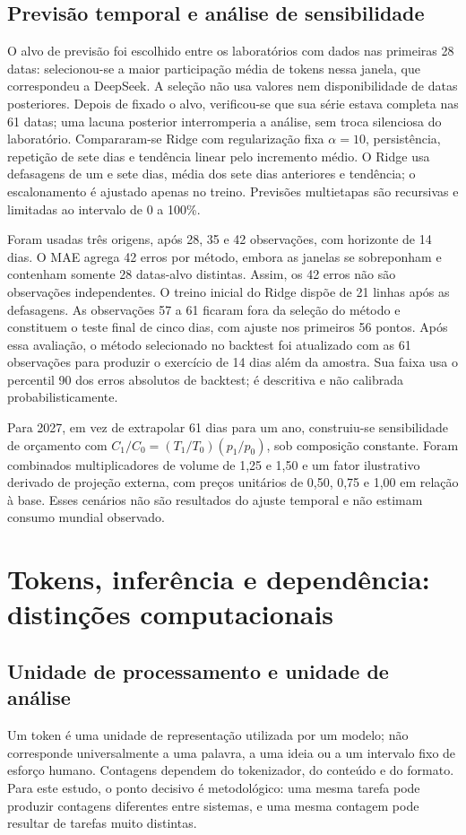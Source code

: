 \documentclass[11pt,a4paper]{article}
\begin{document}
\subsection{Previsão temporal e análise de sensibilidade}
O alvo de previsão foi escolhido entre os laboratórios com dados nas primeiras 28 datas: selecionou-se a maior participação média de tokens nessa janela, que correspondeu a DeepSeek. A seleção não usa valores nem disponibilidade de datas posteriores. Depois de fixado o alvo, verificou-se que sua série estava completa nas 61 datas; uma lacuna posterior interromperia a análise, sem troca silenciosa do laboratório. Compararam-se Ridge com regularização fixa $\alpha=10$, persistência, repetição de sete dias e tendência linear pelo incremento médio. O Ridge usa defasagens de um e sete dias, média dos sete dias anteriores e tendência; o escalonamento é ajustado apenas no treino. Previsões multietapas são recursivas e limitadas ao intervalo de 0 a 100\%.

Foram usadas três origens, após 28, 35 e 42 observações, com horizonte de 14 dias. O MAE agrega 42 erros por método, embora as janelas se sobreponham e contenham somente 28 datas-alvo distintas. Assim, os 42 erros não são observações independentes. O treino inicial do Ridge dispõe de 21 linhas após as defasagens. As observações 57 a 61 ficaram fora da seleção do método e constituem o teste final de cinco dias, com ajuste nos primeiros 56 pontos. Após essa avaliação, o método selecionado no backtest foi atualizado com as 61 observações para produzir o exercício de 14 dias além da amostra. Sua faixa usa o percentil 90 dos erros absolutos de backtest; é descritiva e não calibrada probabilisticamente.

Para 2027, em vez de extrapolar 61 dias para um ano, construiu-se sensibilidade de orçamento com $C_1/C_0=(T_1/T_0)(p_1/p_0)$, sob composição constante. Foram combinados multiplicadores de volume de 1,25 e 1,50 e um fator ilustrativo derivado de projeção externa, com preços unitários de 0,50, 0,75 e 1,00 em relação à base. Esses cenários não são resultados do ajuste temporal e não estimam consumo mundial observado.

\section{Tokens, inferência e dependência: distinções computacionais}
\subsection{Unidade de processamento e unidade de análise}
Um token é uma unidade de representação utilizada por um modelo; não corresponde universalmente a uma palavra, a uma ideia ou a um intervalo fixo de esforço humano. Contagens dependem do tokenizador, do conteúdo e do formato. Para este estudo, o ponto decisivo é metodológico: uma mesma tarefa pode produzir contagens diferentes entre sistemas, e uma mesma contagem pode resultar de tarefas muito distintas.
\end{document}
